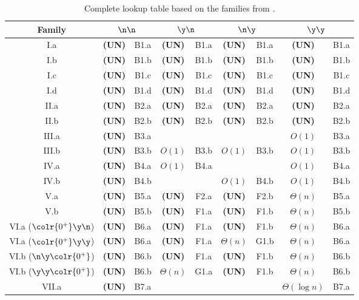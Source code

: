 \begin{table}[th]
    \centering
    \begin{tabular}{|c|cc|cc|cc|cc|}
        \hline
        Family & \multicolumn{2}{c|}{$\n\n$} & \multicolumn{2}{c|}{$\y\n$} & \multicolumn{2}{c|}{$\n\y$} & \multicolumn{2}{c|}{$\y\y$} \\
        \hline
        \textsf{I.a}   & \textbf{(UN)} & B1.a & \textbf{(UN)} & B1.a & \textbf{(UN)} & B1.a & \textbf{(UN)} & B1.a\\
        \textsf{I.b}   & \textbf{(UN)} & B1.b & \textbf{(UN)} & B1.b & \textbf{(UN)} & B1.b & \textbf{(UN)} & B1.b\\
        \textsf{I.c}   & \textbf{(UN)} & B1.c & \textbf{(UN)} & B1.c & \textbf{(UN)} & B1.c & \textbf{(UN)} & B1.c\\
        \textsf{I.d}   & \textbf{(UN)} & B1.d & \textbf{(UN)} & B1.d & \textbf{(UN)} & B1.d & \textbf{(UN)} & B1.d\\
        \textsf{II.a}  & \textbf{(UN)} & B2.a & \textbf{(UN)} & B2.a & \textbf{(UN)} & B2.a & \textbf{(UN)} & B2.a\\
        \textsf{II.b}  & \textbf{(UN)} & B2.b & \textbf{(UN)} & B2.b & \textbf{(UN)} & B2.b & \textbf{(UN)} & B2.b\\
        \textsf{III.a} & \textbf{(UN)} & B3.a & & & & & \boldmath$O(1)$ & B3.a\\
        \textsf{III.b} & \textbf{(UN)} & B3.b & \boldmath$O(1)$ & B3.b & \boldmath$O(1)$ & B3.b & \boldmath$O(1)$ & B3.b\\
        \textsf{IV.a}  & \textbf{(UN)} & B4.a & \boldmath$O(1)$ & B4.a & & & \boldmath$O(1)$ & B4.a\\
        \textsf{IV.b}  & \textbf{(UN)} & B4.b & & & \boldmath$O(1)$ & B4.b & \boldmath$O(1)$ & B4.b\\
        \textsf{V.a}   & \textbf{(UN)} & B5.a & \textbf{(UN)} & F2.a & \textbf{(UN)} & F2.b & \boldmath$\Theta(n)$ & B5.a\\
        \textsf{V.b}   & \textbf{(UN)} & B5.b & \textbf{(UN)} & F1.a & \textbf{(UN)} & F1.b & \boldmath$\Theta(n)$ & B5.b\\
        \textsf{VI.a} ($\colr{0^+}\y\n$)  & \textbf{(UN)} & B6.a & \textbf{(UN)} & F1.a & \textbf{(UN)} & F1.b & \boldmath$\Theta(n)$ & B6.a\\
        \textsf{VI.a} ($\colr{0^+}\y\y$)  & \textbf{(UN)} & B6.a & \textbf{(UN)} & F1.a & \boldmath$\Theta(n)$ & G1.b & \boldmath$\Theta(n)$ & B6.a\\
        \textsf{VI.b} ($\n\y\colr{0^+}$) & \textbf{(UN)} & B6.b & \textbf{(UN)} & F1.a & \textbf{(UN)} & F1.b & \boldmath$\Theta(n)$ & B6.b\\
        \textsf{VI.b} ($\y\y\colr{0^+}$) & \textbf{(UN)} & B6.b & \boldmath$\Theta(n)$ & G1.a & \textbf{(UN)} & F1.b & \boldmath$\Theta(n)$ & B6.b\\
        \textsf{VII.a}   & \textbf{(UN)} & B7.a & & & & &\boldmath$\Theta(\log n)$& B7.a \\
        \hline
    \end{tabular}
    \caption{Complete lookup table based on the families from \cite{balliu-2019}.}
    \label{tab:lookup}
\end{table}